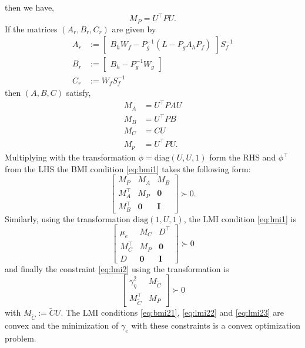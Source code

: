 \documentclass[a4paper]{article}
\begin{document}
then we have, 
\begin{equation}
	M_{P} = U^{\top} {P} U.
\end{equation}
If the matrices $(A_{r}, B_{r}, C_{r})$ are given by 
\begin{equation}
	\begin{aligned}
		A_{r} &:= \begin{bmatrix}
			B_{h} W_{f} - P_{g}^{-1}(L - P_g A_h P_f)
		\end{bmatrix} S_{f}^{-1} \\
		B_{r} &:= \begin{bmatrix}
			B_{h} - P_g^{-1}W_{g}
		\end{bmatrix}\\
		C_{r} &:= W_{f}S_{f}^{-1}
	\end{aligned}
\end{equation}
then $(A, B, C)$ satisfy, 
\begin{align}
	M_{A} &= U^{\top}P A U \\
	M_{B} &= U^{\top}P B\\
	M_{C} &=  C U \\
	M_{p} &= U^{\top}PU.
\end{align}
Multiplying with the transformation $\phi = \textrm{diag}(U, U, 1)$ form the RHS and $\phi^{\top}$  from the LHS the BMI condition \ref{eq:bmi1} takes the following form:
\begin{equation}
	\begin{bmatrix}
		M_{P} & M_{A} & M_{B}\\
		M_{A}^{\top} & M_{P} & \mathbf{0} \\
		M_{B}^{\top} & \mathbf{0} & \mathbf{I}
	\end{bmatrix} \succ 0.
	\label{eq:bmi21}
\end{equation}
Similarly, using the transformation $\textrm{diag}(1, U, 1)$, the LMI condition \ref{eq:lmi1} is 
\begin{equation}
	\begin{bmatrix}	
	\mu_{e} & M_{C} & D^{\top} \\
	M_{C}^{\top} & M_{P} & \mathbf{0} \\
	D & \mathbf{0} & \mathbf{I}
	\end{bmatrix} \succ 0
	\label{eq:lmi22}
\end{equation}
and finally the constraint \ref{eq:lmi2} using the transformation is 
\begin{equation}
	\begin{bmatrix}
		\gamma_{\eta}^{2} & M_{\tilde{C}} \\
		M_{\tilde{C}}^{\top} & M_{P}
	\end{bmatrix} \succ 0 \label{eq:lmi23}
\end{equation}
with $M_{\tilde{C}} := \tilde{C}U$. The LMI conditions  \ref{eq:bmi21}, \ref{eq:lmi22} and \ref{eq:lmi23} are convex and the minimization of $\gamma_{e}$ with these constraints is a convex optimization problem. 
\end{document}
